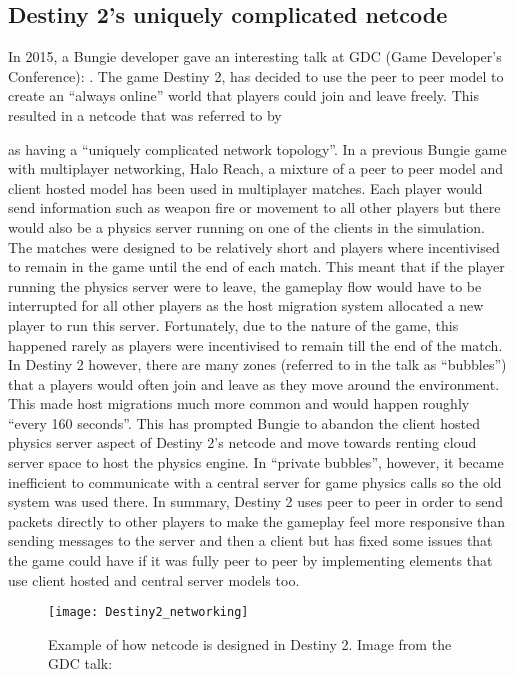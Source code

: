\subsection{Destiny 2's uniquely complicated netcode}
In 2015, a Bungie developer gave an interesting talk at GDC (Game Developer's Conference): . The game Destiny 2, has decided to use the peer to peer model to create an ``always online'' world that players could join and leave freely. This resulted in a netcode that was referred to by \author{truman2015destiny2} as having a  ``uniquely complicated network topology''. In a previous Bungie game with multiplayer networking, Halo Reach,  a mixture of a peer to peer model and client hosted model has been used in multiplayer matches. Each player would send information such as weapon fire or movement to all other players but there would also be a physics server running on one of the clients in the simulation. The matches were designed to be relatively short and players where incentivised to remain in the game until the end of each match. This meant that if the player running the physics server were to leave, the gameplay flow would have to be interrupted for all other players as the host migration system allocated a new player to run this server. Fortunately, due to the nature of the game, this happened rarely as players were incentivised to remain till the end of the match. In Destiny 2 however, there are many zones (referred to in the talk as ``bubbles'') that a players would often join and leave as they move around the environment. This made host migrations much more common and would happen roughly ``every 160 seconds''. This has prompted Bungie to abandon the client hosted physics server aspect of Destiny 2's netcode and move towards renting cloud server space to host the physics engine. In ``private bubbles'', however, it became inefficient to communicate with a central server for game physics calls so the old system was used there. In summary, Destiny 2 uses peer to peer in order to send packets directly to other players to make the gameplay feel more responsive than sending messages to the server and then a client but has fixed some issues that the game could have if it was fully peer to peer by implementing elements that use client hosted and central server models too.

\begin{figure}[!h]
  \centering
  \texttt{[image: Destiny2\_networking]}
  \caption{Example of how netcode is designed in Destiny 2. Image from the GDC talk: }
  \label{fig:destiny2netcode}
\end{figure}

